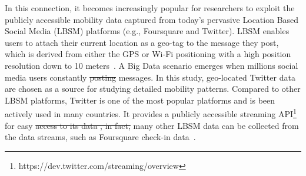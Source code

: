 \documentclass[ijgi,article,submit,moreauthors,pdftex,10pt,a4paper]{mdpi}
\theoremstyle{mdpi}
\newcounter{ex}
\newcounter{re}
\theoremstyle{mdpidefinition}
\providecommand{\DIFadd}[1]{{\protect\color{blue}\uwave{#1}}} %
\providecommand{\DIFdel}[1]{{\protect\color{red}\sout{#1}}}                      %
\providecommand{\DIFaddbegin}{} %
\providecommand{\DIFaddend}{} %
\providecommand{\DIFdelbegin}{} %
\providecommand{\DIFdelend}{} %
\begin{document}
In this connection, it becomes increasingly popular for researchers to exploit the publicly accessible mobility data captured from today's pervasive Location Based Social Media (LBSM) platforms (e.g., Foursquare and Twitter).
LBSM enables users to attach their current location as a geo-tag to the message they post, which is derived from either the GPS or Wi-Fi positioning with a high position resolution down to 10 meters~\cite{Jurdak2015}.
A Big Data scenario emerges when millions social media users constantly \DIFdelbegin \DIFdel{posting }\DIFdelend \DIFaddbegin \DIFadd{post }\DIFaddend messages.
In this study, geo-located Twitter data are chosen as a source for studying detailed mobility patterns.
Compared to other LBSM platforms, Twitter is one of the most popular platforms and is been actively used in many countries.
It provides a publicly accessible streaming API\footnote{https://dev.twitter.com/streaming/overview} for easy \DIFdelbegin \DIFdel{access to its data , in fact, }\DIFdelend \DIFaddbegin \DIFadd{data access.
Indeed, }\DIFaddend many other LBSM data can be collected from the data streams, such as Foursquare check-in data~\cite{cranshaw2012livehoods,hasan2013understanding}.
\end{document}
